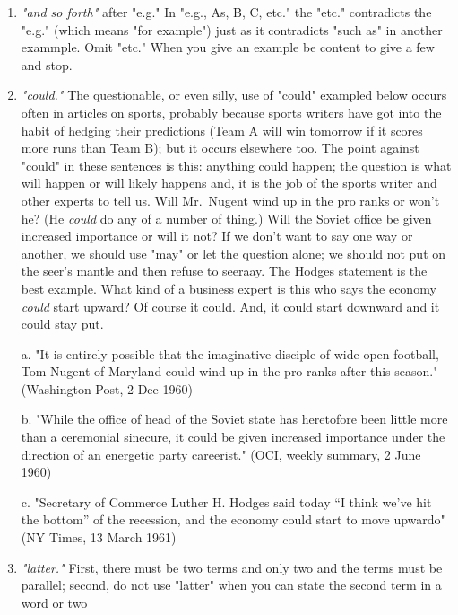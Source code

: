 \documentclass[
    oneside,
    11pt,
    draft
]{memoir}
\begin{document}
\begin{enumerate}
  (1) The analyst gave a talk on the defense of Matsu and Quemoy. 
  
  (2) The analyst gave a talk "The Defense of Matsu and Quemoy" (or, a talk entitled "The Defense of Matsu and Quemoy"). 
  
  (3) The analyst gave a talk on "The Defense of Matsu and Quemoy." 
  
  \item \emph{"and so forth"} after "e.g." In "e.g., As, B, C, etc." the "etc." contradicts the "e.g." (which means "for example") just as it contradicts "such as" in another exammple. Omit "etc." When you give an example be content to give a few and stop.
  
  \item \emph{"could."} The questionable, or even silly, use of "could" exampled below occurs often in articles on sports, probably because sports writers have got into the habit of hedging their predictions (Team A will win tomorrow if it scores more runs than Team B); but it occurs elsewhere too. The point against "could" in these sentences is this: anything could happen; the question is what will happen or will likely happens and, it is the job of the sports writer and other experts to tell us. Will Mr.\ Nugent wind up in the pro ranks or won't he? (He \emph{could} do any of a number of thing.) Will the Soviet office be given increased importance or will it not? If we don't want to say one way or another, we should use "may" or let the question alone; we should not put on the seer's mantle and then refuse to seeraay. The Hodges statement is the best example. What kind of a business expert is this who says the economy \emph{could} start upward? Of course it could. And, it could start downward and it could stay put. 
  
  a. "It is entirely possible that the imaginative disciple of wide open football, Tom Nugent of Maryland could wind up in the pro ranks after this season." (Washington Post, 2 Dee 1960) 
  
  b. "While the office of head of the Soviet state has heretofore been little more than a ceremonial sinecure, it could be given increased importance under the direction of an energetic party careerist." (OCI, weekly summary, 2 June 1960) 
  
  c. "Secretary of Commerce Luther H. Hodges said today \enquote{I think we've hit the bottom} of the recession, and the economy could start to move upwardo" (NY Times, 13 March 1961) 
  
  \item \emph{"latter."} First, there must be two terms and only two and the terms must be parallel; second, do not use "latter" when you can state the second term in a word or two 
  

\end{enumerate}
\end{document}
